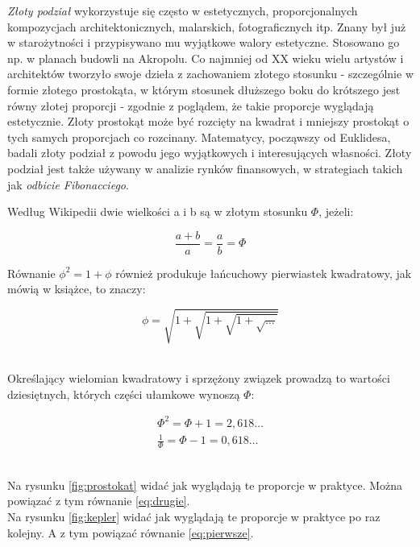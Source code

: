 \documentclass{article}
\begin{document}
\emph{Złoty podział} wykorzystuje się często w estetycznych, proporcjonalnych kompozycjach architektonicznych, malarskich, fotograficznych itp. Znany był już w starożytności i przypisywano mu wyjątkowe walory estetyczne. Stosowano go np. w planach budowli na Akropolu. Co najmniej od XX wieku wielu artystów i architektów tworzyło swoje dzieła z zachowaniem złotego stosunku - szczególnie w formie złotego prostokąta, w którym stosunek dłuższego boku do krótszego jest równy złotej proporcji - zgodnie z poglądem, że takie proporcje wyglądają estetycznie. Złoty prostokąt może być rozcięty na kwadrat i mniejszy prostokąt o tych samych proporcjach co rozcinany. Matematycy, począwszy od Euklidesa, badali złoty podział z powodu jego wyjątkowych i interesujących własności. Złoty podział jest także używany w analizie rynków finansowych, w strategiach takich jak \emph{odbicie Fibonacciego}.
\\
\begin{center}Według Wikipedii\cite{wk} dwie wielkości a i b są w złotym stosunku $\Phi$, jeżeli:\end{center}
\begin{equation}
\frac{a+b}{a} = \frac{a}{b} = \Phi
\label{eq:pierwsze}
\end{equation}
\begin{center} Równanie \begin{math} \phi^{2} = 1 + \phi \end{math} również produkuje łańcuchowy pierwiastek kwadratowy, jak mówią w książce\cite{ks}, to znaczy:\end{center}
\begin{equation}
\phi = \sqrt{ 1+\sqrt{1+{\sqrt{1+{\sqrt{\ldots}}}}}}
\label{eq:drugie}
\end{equation}
\\
\begin{center}Określający wielomian kwadratowy i sprzężony związek prowadzą to wartości dziesiętnych, których części ułamkowe wynoszą $\Phi$:\end{center}
\begin{eqnarray}
\Phi^{2} = \Phi + 1 = 2,618\ldots
\\
\frac{1}{\Phi} = \Phi - 1 = 0,618\ldots
\end{eqnarray}
\\
\begin{flushright}
Na rysunku \ref{fig:prostokat} widać jak wyglądają te proporcje w praktyce. Można powiązać z tym równanie \ref{eq:drugie}.
\\
Na rysunku \ref{fig:kepler} widać jak wyglądają te proporcje w praktyce po raz kolejny. A z tym powiązać równanie \ref{eq:pierwsze}.
\end{flushright}
\end{document}

